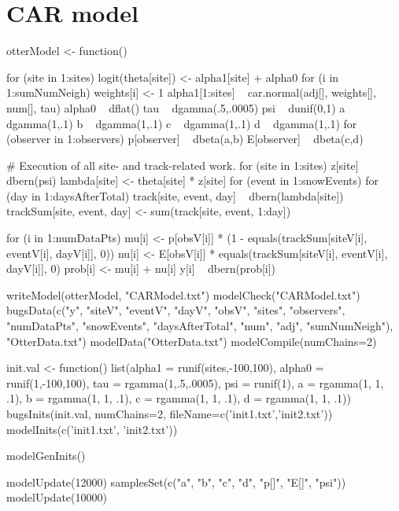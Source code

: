 \documentclass[12pt]{article}
\begin{document}
\section{CAR model}
\scriptsize
\begin{verbatimtab}
otterModel <- function() {
    for (site in 1:sites) {
        logit(theta[site]) <- alpha1[site] + alpha0
    }
    for (i in 1:sumNumNeigh) {
        weights[i] <- 1
    }
    alpha1[1:sites] ~ car.normal(adj[], weights[], num[], tau)
    alpha0 ~ dflat()
    tau ~ dgamma(.5,.0005)
    psi ~ dunif(0,1)
    a ~ dgamma(1,.1)
    b ~ dgamma(1,.1)
    c ~ dgamma(1,.1)
    d ~ dgamma(1,.1)
    for (observer in 1:observers) {
        p[observer] ~ dbeta(a,b) %
        E[observer] ~ dbeta(c,d) %
    }

    # Execution of all site- and track-related work.
    for (site in 1:sites) {
        z[site] ~ dbern(psi)
        lambda[site] <- theta[site] * z[site]
        for (event in 1:snowEvents) {
            for (day in 1:daysAfterTotal) {
                track[site, event, day] ~ dbern(lambda[site])
                trackSum[site, event, day] <- sum(track[site, event, 1:day])
            }
        }
    }

    for (i in 1:numDataPts) {
        mu[i] <-
            p[obsV[i]] * (1 - equals(trackSum[siteV[i], eventV[i], dayV[i]], 0))
        nu[i] <- E[obsV[i]] * equals(trackSum[siteV[i], eventV[i], dayV[i]], 0)
        prob[i] <- mu[i] + nu[i]
        y[i] ~ dbern(prob[i])
    }
}

writeModel(otterModel, "CARModel.txt")
modelCheck("CARModel.txt")
bugsData(c("y", "siteV", "eventV", "dayV", "obsV", "sites", "observers",
           "numDataPts", "snowEvents", "daysAfterTotal", "num", "adj",
           "sumNumNeigh"),
         "OtterData.txt")
modelData("OtterData.txt")
modelCompile(numChains=2)

init.val <- function() {
list(alpha1 = runif(sites,-100,100),
     alpha0 = runif(1,-100,100),
     tau = rgamma(1,.5,.0005),
     psi = runif(1),
     a = rgamma(1, 1, .1),
     b = rgamma(1, 1, .1),
     c = rgamma(1, 1, .1),
     d = rgamma(1, 1, .1))
}
bugsInits(init.val, numChains=2, fileName=c('init1.txt','init2.txt'))
modelInits(c('init1.txt', 'init2.txt'))

modelGenInits()

modelUpdate(12000)
samplesSet(c("a", "b", "c", "d", "p[]", "E[]", "psi"))
modelUpdate(10000)
\end{verbatimtab}
\end{document}
